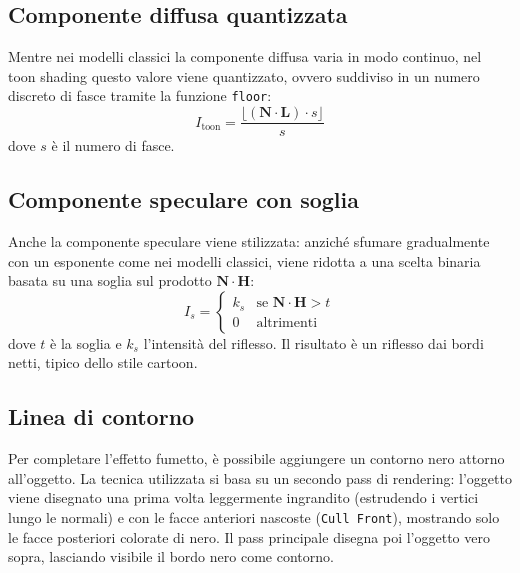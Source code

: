 \documentclass[12pt,a4paper,twoside]{book}
\begin{document}
\subsection{Componente diffusa quantizzata}
\label{subsec:toon-diffusa}
Mentre nei modelli classici la componente diffusa varia in modo continuo, nel toon shading questo valore viene quantizzato, ovvero suddiviso in un numero discreto di fasce tramite la funzione \texttt{floor}:
\begin{equation}
    I_{\text{toon}} = \frac{\lfloor (\mathbf{N} \cdot \mathbf{L})
    \cdot s \rfloor}{s}
    \label{eq:toon-quantize}
\end{equation}
dove $s$ è il numero di fasce.

\subsection{Componente speculare con soglia}
\label{subsec:toon-speculare}

Anche la componente speculare viene stilizzata: anziché sfumare gradualmente con un esponente come nei modelli classici, viene ridotta a una scelta binaria basata su una soglia sul prodotto $\mathbf{N} \cdot \mathbf{H}$:
\begin{equation}
    I_s =
    \begin{cases}
        k_s & \text{se } \mathbf{N} \cdot \mathbf{H} > t \\
        0   & \text{altrimenti}
    \end{cases}
    \label{eq:toon-specular}
\end{equation}
dove $t$ è la soglia e $k_s$ l'intensità del riflesso. Il risultato è un riflesso dai bordi netti, tipico dello stile cartoon.

\subsection{Linea di contorno}
\label{subsec:toon-outline}

Per completare l'effetto fumetto, è possibile aggiungere un contorno nero attorno all'oggetto. La tecnica utilizzata si basa su un secondo pass di rendering: l'oggetto viene disegnato una prima volta leggermente ingrandito (estrudendo i vertici lungo le normali) e con le facce anteriori nascoste (\texttt{Cull Front}), mostrando solo le facce posteriori colorate di nero. Il pass principale disegna poi l'oggetto vero sopra, lasciando visibile il bordo nero come contorno.
\end{document}
